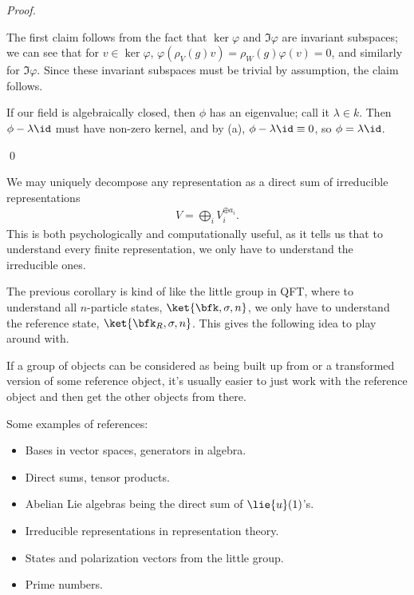 \documentclass[11pt]{article}
\begin{document}
\begin{proof}
    \begin{alphamerate}
        \item The first claim follows from the fact that $\ker{\varphi}$
        and $\Im{\varphi}$ are invariant subspaces; we can see that for
        $v \in \ker{\varphi}$, $\varphi(\rho_V(g) v) = \rho_W(g) \varphi(v) = 0$,
        and similarly for $\Im{\varphi}$. Since these invariant subspaces
        must be trivial by assumption, the claim follows.
        \item If our field is algebraically closed, then $\phi$ has an eigenvalue;
        call it $\lambda \in k$. Then $\phi - \lambda \id$ must have non-zero kernel,
        and by (a), $\phi - \lambda \id \equiv 0$, so $\phi = \lambda \id$.
    \end{alphamerate}
    \qed
\end{proof}

\begin{corollary}
    We may uniquely decompose any representation as a direct
    sum of irreducible representations
    \begin{align*}
        V = \bigoplus_i V_i^{\oplus a_i}.
    \end{align*}
    This is both psychologically and computationally useful,
    as it tells us that to understand every finite representation,
    we only have to understand the irreducible ones.
\end{corollary}

\begin{reemark}
    The previous corollary is kind of like the little group in QFT, 
    where to understand all $n$-particle states, $\ket{\bfk, \sigma, n}$, 
    we only have to understand the reference state, $\ket{\bfk_R, \sigma, n}$.
    This gives the following idea to play around with.
\end{reemark}

\begin{iidea}
    [References]
    If a group of objects can be considered as being built up from or a transformed
    version of some reference object, it's usually easier to just work with
    the reference object and then get the other objects from there.
\end{iidea}

\begin{eexample}
    Some examples of references:
    \begin{itemize}
        \item Bases in vector spaces, generators in algebra.
        \item Direct sums, tensor products.
        \item Abelian Lie algebras being the direct sum of $\lie{u}(1)$'s.  
        \item Irreducible representations in representation theory.
        \item States and polarization vectors from the little group.
        \item Prime numbers.
    \end{itemize}
\end{eexample}
\end{document}
